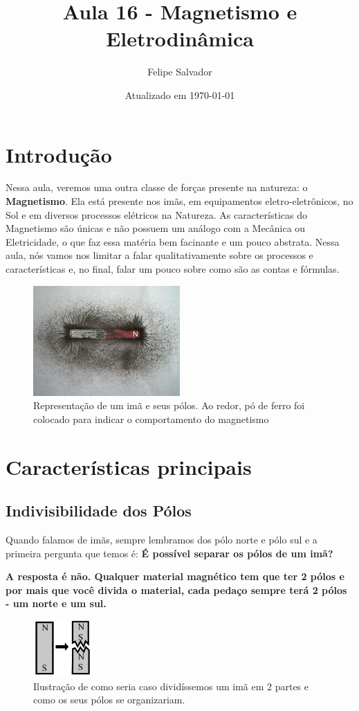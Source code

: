 \documentclass[12pt]{extarticle}
\title{Aula 16 - Magnetismo e Eletrodinâmica}
\author{Felipe Salvador}
\date{Atualizado em \today}
\newcommand{\<}{\langle}
\renewcommand{\>}{\rangle}
\theoremstyle{definition}
\begin{document}
\maketitle

\section{Introdução}
Nessa aula, veremos uma outra classe de forças presente na natureza: o  \textbf{Magnetismo}. Ela está presente nos imãs, em equipamentos eletro-eletrônicos, no Sol e em diversos processos elétricos na Natureza. As características do Magnetismo são únicas e não possuem um análogo com a Mecânica ou Eletricidade, o que faz essa matéria bem facinante e um pouco abstrata. Nessa aula, nós vamos nos limitar a falar qualitativamente sobre os processos e características e, no final, falar um pouco sobre como são as contas e fórmulas.
\begin{figure}[H]
    \centering
    \includegraphics[width=0.5\textwidth]{unnamed.jpg}
    \caption{Representação de um imã e seus pólos. Ao redor, pó de ferro foi colocado para indicar o comportamento do magnetismo}
    \label{fig:ima}
\end{figure}

\section{Características principais}
\subsection{Indivisibilidade dos Pólos}
Quando falamos de imãs, sempre lembramos dos pólo norte e pólo sul e a primeira pergunta que temos é: \textbf{É possível separar os pólos de um imã?}

\textbf{A resposta é não. Qualquer material magnético tem que ter 2 pólos e por mais que você divida o material, cada pedaço sempre terá 2 pólos - um norte e um sul.}
\begin{figure}[H]
    \centering
    \includegraphics[width=0.2\textwidth]{57e42145ea362.jpg}
    \caption{Ilustração de como seria caso dividíssemos um imã em 2 partes e como os seus pólos se organizariam.}
    \label{fig:divisao_polo}
\end{figure}
\end{document}

